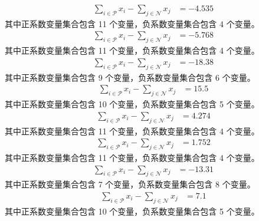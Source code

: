 \documentclass[a4paper,11pt]{article}
\begin{document}
\begin{align}
\sum_{i \in \mathcal{P}} x_i - \sum_{j \in \mathcal{N}} x_j &= -4.535 \nonumber
\end{align}
其中正系数变量集合包含 11 个变量，负系数变量集合包含 4 个变量。\\[0.3em]

\begin{align}
\sum_{i \in \mathcal{P}} x_i - \sum_{j \in \mathcal{N}} x_j &= -5.768 \nonumber
\end{align}
其中正系数变量集合包含 11 个变量，负系数变量集合包含 4 个变量。\\[0.3em]

\begin{align}
\sum_{i \in \mathcal{P}} x_i - \sum_{j \in \mathcal{N}} x_j &= -18.38 \nonumber
\end{align}
其中正系数变量集合包含 9 个变量，负系数变量集合包含 6 个变量。\\[0.3em]

\begin{align}
\sum_{i \in \mathcal{P}} x_i - \sum_{j \in \mathcal{N}} x_j &= 15.5 \nonumber
\end{align}
其中正系数变量集合包含 10 个变量，负系数变量集合包含 5 个变量。\\[0.3em]

\begin{align}
\sum_{i \in \mathcal{P}} x_i - \sum_{j \in \mathcal{N}} x_j &= 4.274 \nonumber
\end{align}
其中正系数变量集合包含 11 个变量，负系数变量集合包含 4 个变量。\\[0.3em]

\begin{align}
\sum_{i \in \mathcal{P}} x_i - \sum_{j \in \mathcal{N}} x_j &= 1.752 \nonumber
\end{align}
其中正系数变量集合包含 11 个变量，负系数变量集合包含 4 个变量。\\[0.3em]

\begin{align}
\sum_{i \in \mathcal{P}} x_i - \sum_{j \in \mathcal{N}} x_j &= -13.31 \nonumber
\end{align}
其中正系数变量集合包含 7 个变量，负系数变量集合包含 8 个变量。\\[0.3em]

\begin{align}
\sum_{i \in \mathcal{P}} x_i - \sum_{j \in \mathcal{N}} x_j &= 7.1 \nonumber
\end{align}
其中正系数变量集合包含 10 个变量，负系数变量集合包含 5 个变量。\\[0.3em]
\end{document}
